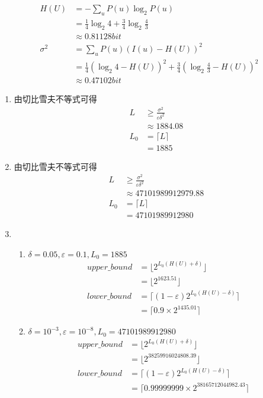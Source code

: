 \documentclass{ctexart}
\begin{document}
\begin{align}
    H(U) &= -\sum_u P(u)\log_2 P(u) \\
    &= \frac{1}{4}\log_2 4 + \frac{3}{4}\log_2 \frac{4}{3} \\
    &\approx 0.81128 bit
    \\
    \sigma^2 &= \sum_u P(u)(I(u) - H(U))^2 \\
    &= \frac{1}{4}(\log_2 4 - H(U))^2 + \frac{3}{4}(\log_2\frac{4}{3} - H(U))^2 \\
    &\approx 0.47102 bit
\end{align}

\begin{enumerate}
    \item 由切比雪夫不等式可得
    \begin{align}
        L &\ge \frac{\sigma^2}{\varepsilon\delta^2} \\
        &\approx 1884.08 \\
        L_0 &= \lceil L\rceil \\
        &= 1885
    \end{align}
    \item 由切比雪夫不等式可得
    \begin{align}
        L &\ge \frac{\sigma^2}{\varepsilon\delta^2} \\
        &\approx 47101989912979.88 \\
        L_0 &= \lceil L\rceil \\
        &= 47101989912980
    \end{align}
    \item\begin{enumerate}
        \item $\delta = 0.05, \varepsilon = 0.1, L_0 = 1885$
        \begin{align}
            upper\_bound &= \lfloor 2^{L_0(H(U) + \delta)}\rfloor \\
            &= \lfloor 2^{1623.51}\rfloor \\
            lower\_bound &= \lceil (1 - \varepsilon)2^{L_0(H(U) - \delta)}\rceil \\
            &= \lceil 0.9 \times 2^{1435.01}\rceil
        \end{align}
        \item $\delta = 10^{-3}, \varepsilon = 10^{-8}, L_0 = 47101989912980$
        \begin{align}
            upper\_bound &= \lfloor 2^{L_0(H(U) + \delta)}\rfloor \\
            &= \lfloor 2^{38259916024808.39}\rfloor \\
            lower\_bound &= \lceil (1 - \varepsilon)2^{L_0(H(U) - \delta)}\rceil \\
            &= \lceil 0.99999999 \times 2^{38165712044982.43}\rceil
        \end{align}
    \end{enumerate}
\end{enumerate}
\end{document}
